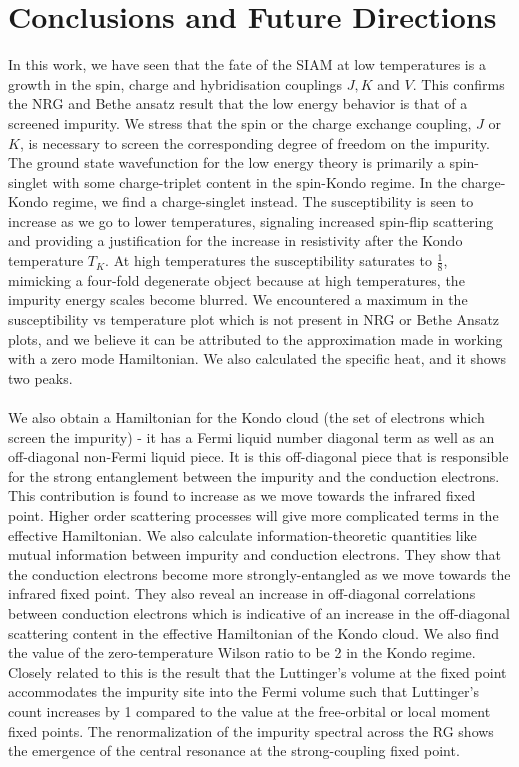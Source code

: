 \documentclass[twoside,11pt]{report}
\numberwithin{equation}{section}
\begin{document}
\chapter{Conclusions and Future Directions}
In this work, we have seen that the fate of the SIAM at low temperatures is a growth in the spin, charge and hybridisation couplings \(J,K\) and \(V\). This confirms the NRG and Bethe ansatz result that the low energy behavior is that of a screened impurity. We stress that the spin or the charge exchange coupling, \(J\) or \(K\), is necessary to screen the corresponding degree of freedom on the impurity. The ground state wavefunction for the low energy theory is primarily a spin-singlet with some charge-triplet content in  the spin-Kondo regime.  In the charge-Kondo regime, we find a charge-singlet instead. The susceptibility is seen to increase as we go to lower temperatures, signaling increased spin-flip scattering and providing a justification for the increase in resistivity after the Kondo temperature \(T_K\). At high temperatures the susceptibility saturates to \(\frac{1}{8}\), mimicking a four-fold degenerate object because at high temperatures, the impurity energy scales become blurred. We encountered a maximum in the susceptibility vs temperature plot which is not present in NRG or Bethe Ansatz plots, and we believe it can be attributed to the approximation made in working with a zero mode Hamiltonian. We also calculated the specific heat, and it shows two peaks.
\\\\We also obtain a Hamiltonian for the Kondo cloud (the set of electrons which screen the impurity) - it has a Fermi liquid number diagonal term as well as an off-diagonal non-Fermi liquid piece. It is this off-diagonal piece that is responsible for the strong entanglement between the impurity and the conduction electrons. This contribution is found to increase as we move towards the infrared  fixed point. Higher order scattering processes will give more complicated terms in the effective Hamiltonian. We also calculate information-theoretic quantities like mutual information between impurity and conduction electrons. They show that the conduction electrons become more strongly-entangled as we move towards the infrared fixed point. They also reveal an increase in off-diagonal correlations between conduction electrons which is indicative of an increase in the off-diagonal scattering content in the effective Hamiltonian of the Kondo cloud. We also find the value of the zero-temperature Wilson ratio to be 2 in the Kondo regime. Closely related to this is the result that the Luttinger's volume at the fixed point accommodates the impurity site into the Fermi volume such that Luttinger's count increases by 1 compared to the value at the free-orbital or local moment fixed points. The renormalization of the impurity spectral across the RG shows the emergence of the central resonance at the strong-coupling fixed point.
\end{document}
